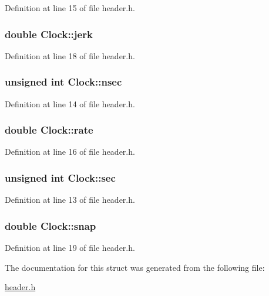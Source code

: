 Definition at line 15 of file header.h.\hypertarget{structClock_a3dbd6eae1fa92ba1dab38409269ef5e2}{
\subsubsection[{jerk}]{\setlength{\rightskip}{0pt plus 5cm}double {\bf Clock::jerk}}}
\label{structClock_a3dbd6eae1fa92ba1dab38409269ef5e2}


Definition at line 18 of file header.h.\hypertarget{structClock_a2aed19e0769b7521a72694474cb8390e}{
\subsubsection[{nsec}]{\setlength{\rightskip}{0pt plus 5cm}unsigned int {\bf Clock::nsec}}}
\label{structClock_a2aed19e0769b7521a72694474cb8390e}


Definition at line 14 of file header.h.\hypertarget{structClock_a8c7791c437d3f43f5056a729b3196262}{
\subsubsection[{rate}]{\setlength{\rightskip}{0pt plus 5cm}double {\bf Clock::rate}}}
\label{structClock_a8c7791c437d3f43f5056a729b3196262}


Definition at line 16 of file header.h.\hypertarget{structClock_ac40897245ac2e0546a181ed323d38a4c}{
\subsubsection[{sec}]{\setlength{\rightskip}{0pt plus 5cm}unsigned int {\bf Clock::sec}}}
\label{structClock_ac40897245ac2e0546a181ed323d38a4c}


Definition at line 13 of file header.h.\hypertarget{structClock_a83923321f6c622631e67f1df5a6e20c8}{
\subsubsection[{snap}]{\setlength{\rightskip}{0pt plus 5cm}double {\bf Clock::snap}}}
\label{structClock_a83923321f6c622631e67f1df5a6e20c8}


Definition at line 19 of file header.h.

The documentation for this struct was generated from the following file:\begin{DoxyCompactItemize}
\item 
\hyperlink{header_8h}{header.h}\end{DoxyCompactItemize}
